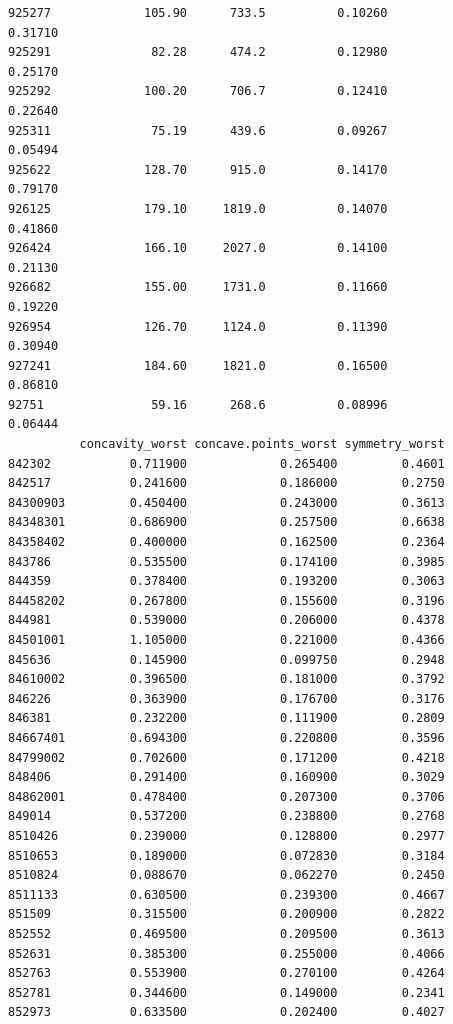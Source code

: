 \documentclass[
  letterpaper,
  DIV=11,
  numbers=noendperiod]{scrartcl}
\begin{document}
\begin{verbatim}
925277             105.90      733.5          0.10260           0.31710
925291              82.28      474.2          0.12980           0.25170
925292             100.20      706.7          0.12410           0.22640
925311              75.19      439.6          0.09267           0.05494
925622             128.70      915.0          0.14170           0.79170
926125             179.10     1819.0          0.14070           0.41860
926424             166.10     2027.0          0.14100           0.21130
926682             155.00     1731.0          0.11660           0.19220
926954             126.70     1124.0          0.11390           0.30940
927241             184.60     1821.0          0.16500           0.86810
92751               59.16      268.6          0.08996           0.06444
          concavity_worst concave.points_worst symmetry_worst
842302           0.711900             0.265400         0.4601
842517           0.241600             0.186000         0.2750
84300903         0.450400             0.243000         0.3613
84348301         0.686900             0.257500         0.6638
84358402         0.400000             0.162500         0.2364
843786           0.535500             0.174100         0.3985
844359           0.378400             0.193200         0.3063
84458202         0.267800             0.155600         0.3196
844981           0.539000             0.206000         0.4378
84501001         1.105000             0.221000         0.4366
845636           0.145900             0.099750         0.2948
84610002         0.396500             0.181000         0.3792
846226           0.363900             0.176700         0.3176
846381           0.232200             0.111900         0.2809
84667401         0.694300             0.220800         0.3596
84799002         0.702600             0.171200         0.4218
848406           0.291400             0.160900         0.3029
84862001         0.478400             0.207300         0.3706
849014           0.537200             0.238800         0.2768
8510426          0.239000             0.128800         0.2977
8510653          0.189000             0.072830         0.3184
8510824          0.088670             0.062270         0.2450
8511133          0.630500             0.239300         0.4667
851509           0.315500             0.200900         0.2822
852552           0.469500             0.209500         0.3613
852631           0.385300             0.255000         0.4066
852763           0.553900             0.270100         0.4264
852781           0.344600             0.149000         0.2341
852973           0.633500             0.202400         0.4027

\end{verbatim}
\end{document}
